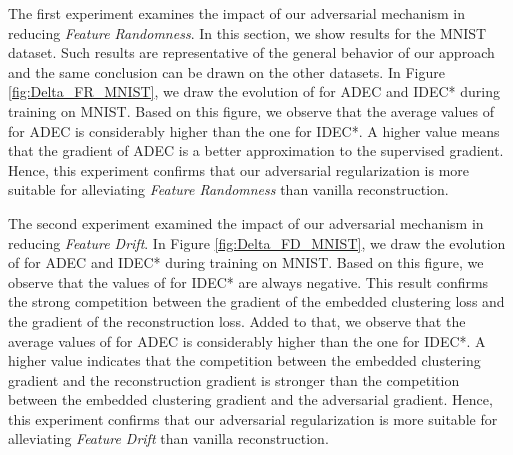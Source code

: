 \documentclass{article}
\begin{document}
The first experiment examines the impact of our adversarial mechanism in reducing \textit{Feature Randomness}. In this section, we show results for the MNIST dataset. Such results are representative of the general behavior of our approach and the same conclusion can be drawn on the other datasets. In Figure \ref{fig:Delta_FR_MNIST}, we draw the evolution of  for ADEC and IDEC* during training on MNIST. Based on this figure, we observe that the average values of  for ADEC is considerably higher than the one for IDEC*. A higher  value means that the gradient of ADEC is a better approximation to the supervised gradient. Hence, this experiment confirms that our adversarial regularization is more suitable for alleviating \textit{Feature Randomness} than vanilla reconstruction. 

\begin{figure*}[ht]
\vskip 0.2in
\centering
    \caption{ during training on MNIST.}
\label{fig:Delta_FR_MNIST}
\end{figure*}









The second experiment examined the impact of our adversarial mechanism in reducing \textit{Feature Drift}. In Figure \ref{fig:Delta_FD_MNIST}, we draw the evolution of  for ADEC and IDEC* during training on MNIST. Based on this figure, we observe that the values of  for IDEC* are always negative. This result confirms the strong competition between the gradient of the embedded clustering loss and the gradient of the reconstruction loss. Added to that, we observe that the average values of  for ADEC is considerably higher than the one for IDEC*. A higher  value indicates that the competition between the embedded clustering gradient and the reconstruction gradient is stronger than the competition between the embedded clustering gradient and the adversarial gradient. Hence, this experiment confirms that our adversarial regularization is more suitable for alleviating \textit{Feature Drift} than vanilla reconstruction. 

\begin{figure*}[ht]
\vskip 0.2in
\centering
    \caption{ during training on MNIST.}
\label{fig:Delta_FD_MNIST}
\end{figure*}
\end{document}
